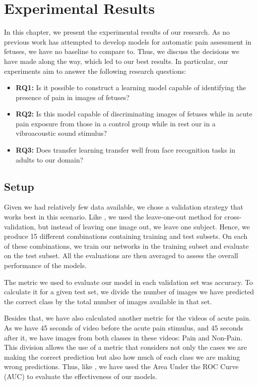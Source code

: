 \chapter{Experimental Results}

In this chapter, we present the experimental results of our research. As no previous work has attempted to develop models for automatic pain assessment in fetuses, we have no baseline to compare to. Thus, we discuss the decisions we have made along the way, which led to our best results. In particular, our experiments aim to answer the following research questions:

\begin{itemize}
    \item \textbf{RQ1:} Is it possible to construct a learning model capable of identifying the presence of pain in images of fetuses?
    
    \item \textbf{RQ2:} Is this model capable of discriminating images of fetuses while in acute pain exposure from those in a control group while in rest our in a vibroacoustic sound stimulus?
    
    \item \textbf{RQ3:} Does transfer learning transfer well from face recognition tasks in adults to our domain?
\end{itemize}

\section{Setup}

Given we had relatively few data available, we chose a validation strategy that works best in this scenario. Like \cite{CelonaM17}, we used the leave-one-out method for cross-validation, but instead of leaving one image out, we leave one subject. Hence, we produce 15 different combinations containing training and test subsets. On each of these combinations, we train our networks in the training subset and evaluate on the test subset. All the evaluations are then averaged to assess the overall performance of the models.

The metric we used to evaluate our model in each validation set was accuracy. To calculate it for a given test set, we divide the number of images we have predicted the correct class by the total number of images available in that set.

Besides that, we have also calculated another metric for the videos of acute pain. As we have 45 seconds of video before the acute pain stimulus, and 45 seconds after it, we have images from both classes in these videos: Pain and Non-Pain.  This division allows the use of a metric that considers not only the cases we are making the correct prediction but also how much of each class we are making wrong predictions. Thus, like \cite{abs-1807-01631}, we have used the Area Under the ROC Curve (AUC) to evaluate the effectiveness of our models.

